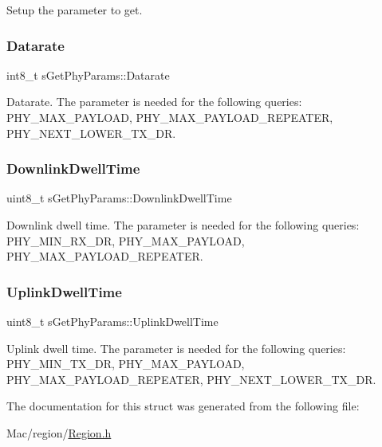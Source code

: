 Setup the parameter to get. \mbox{\label{structsGetPhyParams_a61e3c3a6f1b2857333242fad7fd42263}} 
\subsubsection{\texorpdfstring{Datarate}{Datarate}}
{\footnotesize\ttfamily int8\+\_\+t s\+Get\+Phy\+Params\+::\+Datarate}

Datarate. The parameter is needed for the following queries\+: P\+H\+Y\+\_\+\+M\+A\+X\+\_\+\+P\+A\+Y\+L\+O\+AD, P\+H\+Y\+\_\+\+M\+A\+X\+\_\+\+P\+A\+Y\+L\+O\+A\+D\+\_\+\+R\+E\+P\+E\+A\+T\+ER, P\+H\+Y\+\_\+\+N\+E\+X\+T\+\_\+\+L\+O\+W\+E\+R\+\_\+\+T\+X\+\_\+\+DR. \mbox{\label{structsGetPhyParams_aeb0e2347bed31d4bf1cc490ba01ca523}} 
\subsubsection{\texorpdfstring{Downlink\+Dwell\+Time}{DownlinkDwellTime}}
{\footnotesize\ttfamily uint8\+\_\+t s\+Get\+Phy\+Params\+::\+Downlink\+Dwell\+Time}

Downlink dwell time. The parameter is needed for the following queries\+: P\+H\+Y\+\_\+\+M\+I\+N\+\_\+\+R\+X\+\_\+\+DR, P\+H\+Y\+\_\+\+M\+A\+X\+\_\+\+P\+A\+Y\+L\+O\+AD, P\+H\+Y\+\_\+\+M\+A\+X\+\_\+\+P\+A\+Y\+L\+O\+A\+D\+\_\+\+R\+E\+P\+E\+A\+T\+ER. \mbox{\label{structsGetPhyParams_ad59a5078532942653d4423c2bf128ed8}} 
\subsubsection{\texorpdfstring{Uplink\+Dwell\+Time}{UplinkDwellTime}}
{\footnotesize\ttfamily uint8\+\_\+t s\+Get\+Phy\+Params\+::\+Uplink\+Dwell\+Time}

Uplink dwell time. The parameter is needed for the following queries\+: P\+H\+Y\+\_\+\+M\+I\+N\+\_\+\+T\+X\+\_\+\+DR, P\+H\+Y\+\_\+\+M\+A\+X\+\_\+\+P\+A\+Y\+L\+O\+AD, P\+H\+Y\+\_\+\+M\+A\+X\+\_\+\+P\+A\+Y\+L\+O\+A\+D\+\_\+\+R\+E\+P\+E\+A\+T\+ER, P\+H\+Y\+\_\+\+N\+E\+X\+T\+\_\+\+L\+O\+W\+E\+R\+\_\+\+T\+X\+\_\+\+DR. 

The documentation for this struct was generated from the following file\+:\begin{DoxyCompactItemize}
\item 
Mac/region/\hyperlink{Region_8h}{Region.\+h}\end{DoxyCompactItemize}
